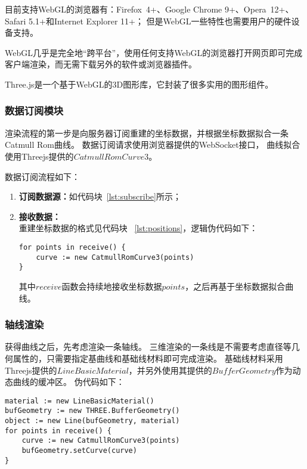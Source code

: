 目前支持WebGL的浏览器有：Firefox 4+、Google Chrome 9+、Opera 12+、Safari 5.1+和Internet Explorer 11+；
但是WebGL一些特性也需要用户的硬件设备支持。

WebGL几乎是完全地“跨平台”，使用任何支持WebGL的浏览器打开网页即可完成客户端渲染，而无需下载另外的软件或浏览器插件。

Three.js是一个基于WebGL的3D图形库\cite{threejs}，它封装了很多实用的图形组件。

\subsubsection{数据订阅模块}
渲染流程的第一步是向服务器订阅重建的坐标数据，并根据坐标数据拟合一条Catmull Rom曲线。
数据订阅请求使用浏览器提供的WebSocket接口\cite{mdn-websocket}，
曲线拟合使用Threejs提供的$CatmullRomCurve3$。

数据订阅流程如下：

\begin{enumerate}
\item \textbf{订阅数据源：}如代码块~\ref{lst:subscribe}所示；
\item \textbf{接收数据：} \\
重建坐标数据的格式见代码块 ~\ref{lst:positions}，逻辑伪代码如下：

\begin{lstlisting}[caption={订阅数据}]
for points in receive() {
    curve := new CatmullRomCurve3(points)
}
\end{lstlisting}

其中$receive$函数会持续地接收坐标数据$points$，之后再基于坐标数据拟合曲线。

\end{enumerate}

\subsubsection{轴线渲染}

获得曲线之后，先考虑渲染一条轴线。
三维渲染的一条线是不需要考虑直径等几何属性的，只需要指定基曲线和基础线材料即可完成渲染。
基础线材料采用Threejs提供的$LineBasicMaterial$，并另外使用其提供的$BufferGeometry$作为动态曲线的缓冲区。
伪代码如下：

\begin{lstlisting}[caption={渲染轴线}]
material := new LineBasicMaterial()
bufGeometry := new THREE.BufferGeometry()
object := new Line(bufGeometry, material)
for points in receive() {
    curve := new CatmullRomCurve3(points)
    bufGeometry.setCurve(curve)
}
\end{lstlisting}

